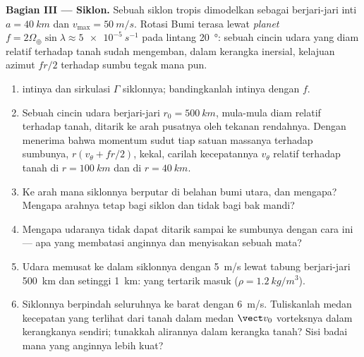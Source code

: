 \begin{problem}
\medskip
\noindent\textbf{Bagian III --- Siklon.}
Sebuah siklon tropis dimodelkan sebagai  berjari-jari inti
$a = \qty{40}{km}$ dan $v_{\max} = \qty{50}{m/s}$. Rotasi Bumi terasa
lewat \emph{ planet} $f = 2\Omega_\oplus\sin\lambda
\approx \qty{5e-5}{s^{-1}}$ pada lintang \qty{20}{\degree}: sebuah cincin udara yang
diam relatif terhadap tanah sudah mengemban, dalam kerangka inersial,
kelajuan azimut $fr/2$ terhadap sumbu tegak mana pun.
\begin{enumerate}[resume]
  \item {} intinya dan sirkulasi $\Gamma$ siklonnya;
        bandingkanlah  intinya dengan $f$.
  \item Sebuah cincin udara berjari-jari $r_0 = \qty{500}{km}$, mula-mula diam
        relatif terhadap tanah, ditarik ke arah pusatnya oleh
        tekanan rendahnya. Dengan menerima bahwa momentum sudut tiap
        satuan massanya terhadap sumbunya, $r(v_\theta + fr/2)$, kekal, carilah
        kecepatannya $v_\theta$ relatif terhadap tanah di $r = \qty{100}{km}$
        dan di $r = \qty{40}{km}$.
  \item Ke arah mana siklonnya berputar di belahan bumi utara, dan
        mengapa? Mengapa arahnya tetap bagi siklon dan tidak bagi bak
        mandi?
  \item Mengapa udaranya tidak dapat ditarik sampai ke sumbunya dengan
        cara ini --- apa yang membatasi anginnya dan menyisakan sebuah mata?
  \item Udara memusat ke dalam siklonnya dengan \qty{5}{m/s} lewat
        tabung berjari-jari \qty{500}{km} dan setinggi \qty{1}{km}:  yang tertarik masuk ($\rho = \qty{1.2}{kg/m^3}$).
  \item Siklonnya berpindah seluruhnya ke barat dengan \qty{6}{m/s}. Tuliskanlah
        medan kecepatan  yang terlihat dari tanah dalam
        medan $\vect v_0$ vorteksnya dalam kerangkanya sendiri; tunakkah
        alirannya dalam kerangka tanah? Sisi badai mana yang anginnya
        lebih kuat?
\end{enumerate}


\end{problem}
